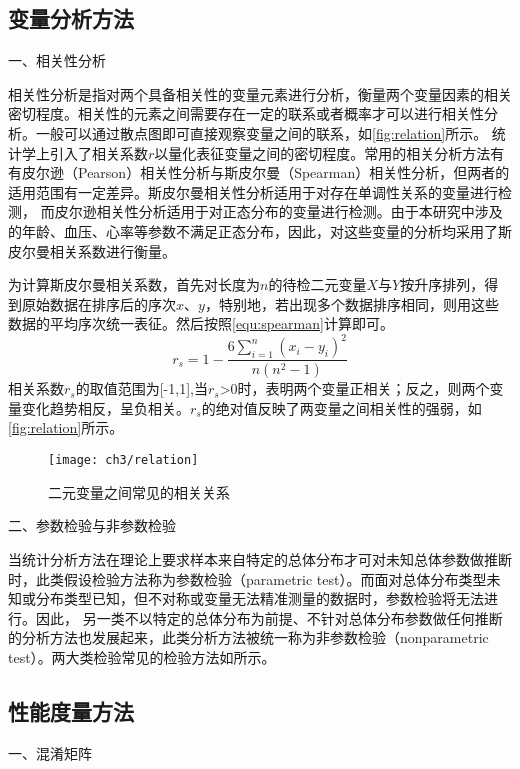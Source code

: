 \subsection{变量分析方法}
一、相关性分析

相关性分析是指对两个具备相关性的变量元素进行分析，衡量两个变量因素的相关密切程度\cite{Zhang2019}。相关性的元素之间需要存在一定的联系或者概率才可以进行相关性分析。一般可以通过散点图即可直接观察变量之间的联系，如\autoref{fig:relation}所示。
统计学上引入了相关系数$r$以量化表征变量之间的密切程度。常用的相关分析方法有有皮尔逊（Pearson）相关性分析与斯皮尔曼（Spearman）相关性分析，但两者的适用范围有一定差异。斯皮尔曼相关性分析适用于对存在单调性关系的变量进行检测，
而皮尔逊相关性分析适用于对正态分布的变量进行检测。由于本研究中涉及的年龄、血压、心率等参数不满足正态分布，因此，对这些变量的分析均采用了斯皮尔曼相关系数进行衡量。

为计算斯皮尔曼相关系数，首先对长度为$n$的待检二元变量$X$与$Y$按升序排列，得到原始数据在排序后的序次$x$、$y$，特别地，若出现多个数据排序相同，则用这些数据的平均序次统一表征。然后按照\autoref{equ:spearman}计算即可。
\begin{equation}
      \label{equ:spearman}
      r_{s}=1-\frac{6\sum_{i=1}^{n}(x_{i}-y_{i})^2}{n(n^2-1)}
\end{equation}
相关系数$r_{s}$的取值范围为[-1,1],当$r_{s}$>0时，表明两个变量正相关；反之，则两个变量变化趋势相反，呈负相关。$r_{s}$的绝对值反映了两变量之间相关性的强弱，如\autoref{fig:relation}所示。
\begin{figure}[htbp]
      \centering
      \texttt{[image: ch3/relation]}
      \caption{\label{fig:relation}二元变量之间常见的相关关系}
\end{figure}

二、参数检验与非参数检验

当统计分析方法在理论上要求样本来自特定的总体分布才可对未知总体参数做推断时，此类假设检验方法称为参数检验（parametric test）。而面对总体分布类型未知或分布类型已知，但不对称或变量无法精准测量的数据时，参数检验将无法进行。因此，
另一类不以特定的总体分布为前提、不针对总体分布参数做任何推断的分析方法也发展起来，此类分析方法被统一称为非参数检验（nonparametric test）\cite{Guo2017,Hu2021,Zhang2019}。两大类检验常见的检验方法如所示。

\subsection{性能度量方法}
一、混淆矩阵

